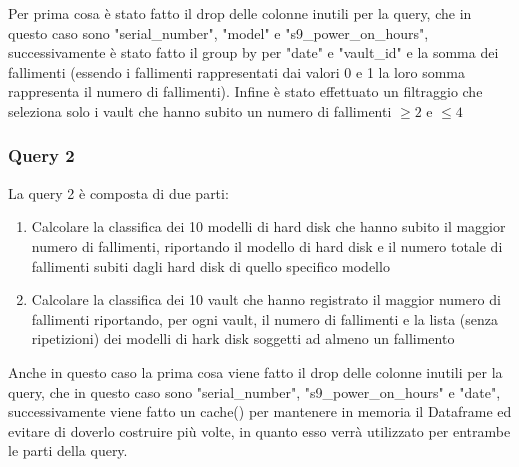 \documentclass[conference]{IEEEtran}
\begin{document}
Per prima cosa è stato fatto il drop delle colonne inutili per la query, che in questo caso sono "serial\_number", "model" e "s9\_power\_on\_hours", successivamente è stato fatto il group by per "date" e "vault\_id" e la somma dei fallimenti (essendo i fallimenti rappresentati dai valori 0 e 1 la loro somma rappresenta il numero di fallimenti). Infine è stato effettuato un filtraggio che seleziona solo i vault che hanno subito un numero di fallimenti $\geq2$ e $\leq4$ 

\subsubsection{Query 2}
La query 2 è composta di due parti:
\begin{enumerate}
    \item Calcolare la classifica dei 10 modelli di hard disk che hanno subito il maggior numero di fallimenti, riportando il modello di hard disk e il numero totale di fallimenti subiti dagli hard disk di quello specifico modello
    \item Calcolare la classifica dei 10 vault che hanno registrato il maggior numero di
    fallimenti riportando, per ogni vault, il numero di fallimenti e la lista (senza ripetizioni) dei modelli di
    hark disk soggetti ad almeno un fallimento
\end{enumerate}
Anche in questo caso la prima cosa viene fatto il drop delle colonne inutili per la query, che in questo caso sono "serial\_number", "s9\_power\_on\_hours" e "date", successivamente viene fatto un cache() per mantenere in memoria il Dataframe ed evitare di doverlo costruire più volte, in quanto esso verrà utilizzato per entrambe le parti della query.
\end{document}
